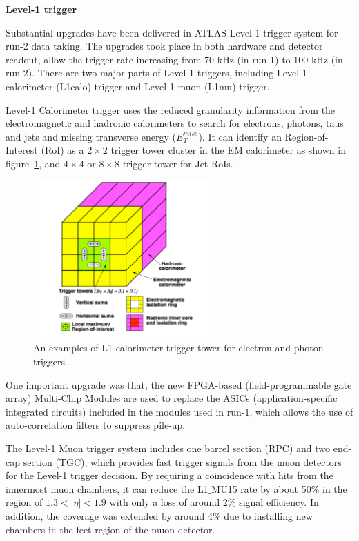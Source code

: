 \textbf{Level-1 trigger}

Substantial upgrades have been delivered in ATLAS Level-1 trigger system for run-2 data taking.
The upgrades took place in both hardware and detector readout, allow the trigger rate increasing from 70 kHz (in run-1) to 100 kHz (in run-2).
There are two major parts of Level-1 triggers, including Level-1 calorimeter (L1calo) trigger and Level-1 muon (L1mu) trigger.

Level-1 Calorimeter trigger uses the reduced granularity information from the electromagnetic and hadronic calorimeters to search for electrons, photons, taus and jets and missing transverse energy ($E_{T}^{miss}$).
It can identify an Region-of-Interest (RoI) as a $2 \times 2$ trigger tower cluster in the EM calorimeter as shown in figure~\ref{fig:trig_tower}, 
and $4 \times 4$ or $8 \times 8$ trigger tower for Jet RoIs.
\begin{figure}[!htb]
  \centering
  \includegraphics[width=0.6\textwidth]{figures/Detector/trig_tower.png}
  \caption{An examples of L1 calorimeter trigger tower for electron and photon triggers\cite{Pasztor:2063746}.}
  \label{fig:trig_tower}
\end{figure}
One important upgrade was that, the new FPGA-based (field-programmable gate array) Multi-Chip Modules are used to replace the ASICs (application-specific integrated circuits) included in the modules used in run-1,
which allows the use of auto-correlation filters to suppress pile-up.

The Level-1 Muon trigger system includes one barrel section (RPC) and two end-cap section (TGC), which provides fast trigger signals from the muon detectors for the Level-1 trigger decision.
By requiring a coincidence with hits from the innermost muon chambers, it can reduce the L1$\_$MU15 rate by about 50\% in the region of $1.3 < |\eta| < 1.9$ with only a loss of around 2\% signal efficiency.
In addition, the coverage was extended by around 4\% due to installing new chambers in the feet region of the muon detector.

